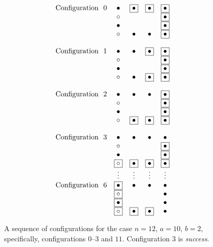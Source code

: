 \documentclass{article}
\begin{document}
\begin{figure}[htb]
\[
\begin{array}{rcccc}
\mbox{Configuration } \ 0 &
\bullet & \fbox{$\bullet$} & \fbox{$\bullet$} & \fbox{$\bullet$}  \\
& \circ   &                      &                      & \fbox{$\bullet$}  \\
& \bullet &                      &                      & \fbox{$\bullet$}  \\
& \circ    &  \bullet          &   \bullet         & \fbox{$\bullet$} \\
 \\
\mbox{Configuration } \ 1 &
\bullet & \bullet          & \fbox{$\bullet$} & \fbox{$\bullet$}  \\
& \circ   &                      &                      & \fbox{$\bullet$}  \\
& \bullet &                      &                      & \fbox{$\bullet$}  \\
& \circ    &  \bullet           & \fbox{$\bullet$} & \fbox{$\bullet$} \\
 \\
\mbox{Configuration } \ 2 &
\bullet & \bullet          &      \bullet     & \fbox{$\bullet$} \\
& \circ   &                      &                      & \fbox{$\bullet$}  \\
& \bullet &                      &                      & \fbox{$\bullet$}  \\
& \circ   & \fbox{$\bullet$} & \fbox{$\bullet$} & \fbox{$\bullet$} \\
 \\
\mbox{Configuration } \  3 &
\bullet & \bullet                 &            \bullet & \bullet  \\
& \circ    &                            &                      & \fbox{$\bullet$}  \\
& \bullet &                            &                      & \fbox{$\bullet$}  \\
& \fbox{$\circ$} &  \fbox{$\bullet$} & \fbox{$\bullet$} & \fbox{$\bullet$} \\

 & \vdots & \vdots & \vdots & \vdots \\

\mbox{Configuration } \ 6 &
 \fbox{$\bullet$} & \bullet & \bullet & \bullet  \\
& \fbox{$\circ$}   &                      &                      & \bullet  \\
&  \fbox{$\bullet$} &                      &                      & \bullet  \\
& \fbox{$\circ$}    &   \fbox{$\bullet$}          &    \fbox{$\bullet$}   & \bullet \\
\end{array}
\]
\caption{A sequence of configurations for the case $n=12$, $a = 10$, $b=2$, specifically, configurations $0$--$3$ and $11$.  Configuration $3$ is {\em success}.}
\label{fig:necklace}
\end{figure}
\end{document}

